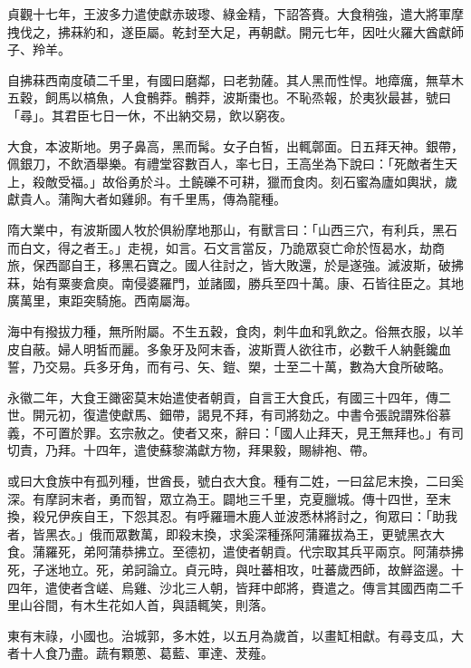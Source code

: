 \begin{pinyinscope}
 貞觀十七年，王波多力遣使獻赤玻瓈、綠金精，下詔答賚。大食稍強，遣大將軍摩拽伐之，拂菻約和，遂臣屬。乾封至大足，再朝獻。開元七年，因吐火羅大酋獻師子、羚羊。



 自拂菻西南度磧二千里，有國曰磨鄰，曰老勃薩。其人黑而性悍。地瘴癘，無草木五穀，飼馬以槁魚，人食鶻莽。鶻莽，波斯棗也。不恥烝報，於夷狄最甚，號曰「尋」。其君臣七日一休，不出納交易，飲以窮夜。



 大食，本波斯地。男子鼻高，黑而髯。女子白皙，出輒鄣面。日五拜天神。銀帶，佩銀刀，不飲酒舉樂。有禮堂容數百人，率七日，王高坐為下說曰：「死敵者生天上，殺敵受福。」故俗勇於斗。土饒礫不可耕，獵而食肉。刻石蜜為廬如輿狀，歲獻貴人。蒲陶大者如雞卵。有千里馬，傳為龍種。



 隋大業中，有波斯國人牧於俱紛摩地那山，有獸言曰：「山西三穴，有利兵，黑石而白文，得之者王。」走視，如言。石文言當反，乃詭眾裒亡命於恆曷水，劫商旅，保西鄙自王，移黑石寶之。國人往討之，皆大敗還，於是遂強。滅波斯，破拂菻，始有粟麥倉庾。南侵婆羅門，並諸國，勝兵至四十萬。康、石皆往臣之。其地廣萬里，東距突騎施。西南屬海。



 海中有撥拔力種，無所附屬。不生五穀，食肉，刺牛血和乳飲之。俗無衣服，以羊皮自蔽。婦人明皙而麗。多象牙及阿末香，波斯賈人欲往市，必數千人納氎鑱血誓，乃交易。兵多牙角，而有弓、矢、鎧、槊，士至二十萬，數為大食所破略。



 永徽二年，大食王豃密莫末始遣使者朝貢，自言王大食氏，有國三十四年，傳二世。開元初，復遣使獻馬、鈿帶，謁見不拜，有司將劾之。中書令張說謂殊俗慕義，不可置於罪。玄宗赦之。使者又來，辭曰：「國人止拜天，見王無拜也。」有司切責，乃拜。十四年，遣使蘇黎滿獻方物，拜果毅，賜緋袍、帶。



 或曰大食族中有孤列種，世酋長，號白衣大食。種有二姓，一曰盆尼末換，二曰奚深。有摩訶末者，勇而智，眾立為王。闢地三千里，克夏臘城。傳十四世，至末換，殺兄伊疾自王，下怨其忍。有呼羅珊木鹿人並波悉林將討之，徇眾曰：「助我者，皆黑衣。」俄而眾數萬，即殺末換，求奚深種孫阿蒲羅拔為王，更號黑衣大食。蒲羅死，弟阿蒲恭拂立。至德初，遣使者朝貢。代宗取其兵平兩京。阿蒲恭拂死，子迷地立。死，弟訶論立。貞元時，與吐蕃相攻，吐蕃歲西師，故鮮盜邊。十四年，遣使者含嵯、烏雞、沙北三人朝，皆拜中郎將，賚遣之。傳言其國西南二千里山谷間，有木生花如人首，與語輒笑，則落。



 東有末祿，小國也。治城郭，多木姓，以五月為歲首，以畫缸相獻。有尋支瓜，大者十人食乃盡。蔬有顆蔥、葛藍、軍達、茇薤。




\end{pinyinscope}
